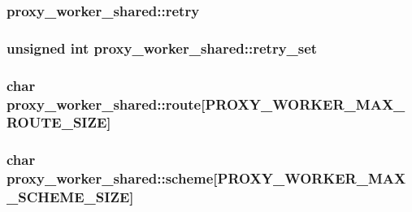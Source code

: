 \subsubsection[{\texorpdfstring{retry}{retry}}]{ proxy\+\_\+worker\+\_\+shared\+::retry}\hypertarget{structproxy__worker__shared_a44c9e7280e010d24796b473de3ff1548}{}\label{structproxy__worker__shared_a44c9e7280e010d24796b473de3ff1548}
\subsubsection[{\texorpdfstring{retry\+\_\+set}{retry_set}}]{\setlength{\rightskip}{0pt plus 5cm}unsigned {\bf int} proxy\+\_\+worker\+\_\+shared\+::retry\+\_\+set}\hypertarget{structproxy__worker__shared_abfb24070f61b19e43c6e25d90294c768}{}\label{structproxy__worker__shared_abfb24070f61b19e43c6e25d90294c768}
\subsubsection[{\texorpdfstring{route}{route}}]{\setlength{\rightskip}{0pt plus 5cm}char proxy\+\_\+worker\+\_\+shared\+::route\mbox{[}{\bf P\+R\+O\+X\+Y\+\_\+\+W\+O\+R\+K\+E\+R\+\_\+\+M\+A\+X\+\_\+\+R\+O\+U\+T\+E\+\_\+\+S\+I\+ZE}\mbox{]}}\hypertarget{structproxy__worker__shared_a81e88d50ff982a71c76531f19a4fd91e}{}\label{structproxy__worker__shared_a81e88d50ff982a71c76531f19a4fd91e}
\subsubsection[{\texorpdfstring{scheme}{scheme}}]{\setlength{\rightskip}{0pt plus 5cm}char proxy\+\_\+worker\+\_\+shared\+::scheme\mbox{[}{\bf P\+R\+O\+X\+Y\+\_\+\+W\+O\+R\+K\+E\+R\+\_\+\+M\+A\+X\+\_\+\+S\+C\+H\+E\+M\+E\+\_\+\+S\+I\+ZE}\mbox{]}}\hypertarget{structproxy__worker__shared_a04bc47e7a3670347a1ed46d28b757369}{}\label{structproxy__worker__shared_a04bc47e7a3670347a1ed46d28b757369}
